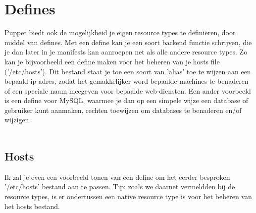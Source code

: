 \chapter{Defines}
Puppet biedt ook de mogelijkheid je eigen resource types te defini\"{e}ren, door middel van defines. Met een define kan je een soort backend functie schrijven, die je dan later in je manifests kan aanroepen net als alle andere resource types. Zo kan je bijvoorbeeld een define maken voor het beheren van je hosts file ('/etc/hosts'). Dit bestand staat je toe een soort van 'alias' toe te wijzen aan een bepaald ip-adres, zodat het gemakkelijker word bepaalde machines te benaderen of een speciale naam meegeven voor bepaalde web-diensten. Een ander voorbeeld is een define voor MySQL, waarmee je dan op een simpele wijze een database of gebruiker kunt aanmaken, rechten toewijzen om databases te benaderen en/of wijzigen.\\\\

\section{Hosts}
Ik zal je even een voorbeeld tonen van een define om het eerder besproken '/etc/hosts' bestand aan te passen. Tip: zoals we daarnet vermeldden bij de resource types, is er ondertussen een native resource type is voor het beheren van het hosts bestand.\\
